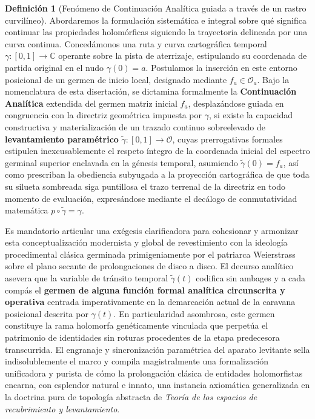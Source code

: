 \documentclass[11pt,a4paper]{article}
\theoremstyle{definition}
\newtheorem{definicion}{Definición}[section]
\theoremstyle{remark}
\numberwithin{equation}{section}
\begin{document}
\begin{definicion}[Fenómeno de Continuación Analítica guiada a través de un rastro curvilíneo]
Abordaremos la formulación sistemática e integral sobre qué significa continuar las propiedades holomórficas siguiendo la trayectoria delineada por una curva continua. Concedámonos una ruta y curva cartográfica temporal $\gamma: [0, 1] \to \mathbb{C}$ operante sobre la pista de aterrizaje, estipulando su coordenada de partida original en el nudo $\gamma(0) = a$. Postulamos la inserción en este entorno posicional de un germen de inicio local, designado mediante $f_a \in \mathcal{O}_a$.
Bajo la nomenclatura de esta disertación, se dictamina formalmente la \textbf{Continuación Analítica} extendida del germen matriz inicial $f_a$, desplazándose guiada en congruencia con la directriz geométrica impuesta por $\gamma$, si existe la capacidad constructiva y materialización de un trazado continuo sobreelevado de \textbf{levantamiento paramétrico} $\widetilde{\gamma}: [0, 1] \to \mathcal{O}$, cuyas prerrogativas formales estipulen inexcusablemente el respeto íntegro de la coordenada inicial del espectro germinal superior enclavada en la génesis temporal, asumiendo $\widetilde{\gamma}(0) = f_a$, así como prescriban la obediencia subyugada a la proyección cartográfica de que toda su silueta sombreada siga puntillosa el trazo terrenal de la directriz en todo momento de evaluación, expresándose mediante el decálogo de conmutatividad matemática $p \circ \widetilde{\gamma} = \gamma$.

Es mandatorio articular una exégesis clarificadora para cohesionar y armonizar esta conceptualización modernista y global de revestimiento con la ideología procedimental clásica germinada primigeniamente por el patriarca Weierstrass sobre el plano secante de prolongaciones de disco a disco. El decurso analítico asevera que la variable de tránsito temporal $\widetilde{\gamma}(t)$ codifica sin ambages y a cada compás el \textbf{germen de alguna función formal analítica circunscrita y operativa} centrada imperativamente en la demarcación actual de la caravana posicional descrita por $\gamma(t)$. En particularidad asombrosa, este germen constituye la rama holomorfa genéticamente vinculada que perpetúa el patrimonio de identidades sin roturas procedentes de la etapa predecesora transcurrida. El engranaje y sincronización paramétrica del aparato levitante sella indisolublemente el marco y compila magistralmente una formalización unificadora y purista de cómo la prolongación clásica de entidades holomorfistas encarna, con esplendor natural e innato, una instancia axiomática generalizada en la doctrina pura de topología abstracta de \textit{Teoría de los espacios de recubrimiento y levantamiento}.
\end{definicion}
\end{document}
